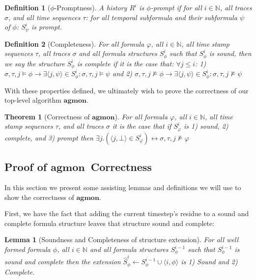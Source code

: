 \documentclass[10pt,a4paper]{article}
\newcommand{\rp}[2]{\ensuremath{\langle #1, #2 \rangle}}
\newcommand{\agmon}{\ensuremath{\mathbf{agmon}}}
\newtheorem{thm}{Theorem}
\newtheorem{tdef}{Definition}
\newtheorem{lemma}{Lemma}
\begin{document}
\begin{tdef}[$\phi$-Promptness]
A history $R^i$ is $\phi$-prompt if for all $i \in \mathbb{N}$, all traces $\sigma$, and all time sequences $\tau$: for all temporal subformula and their subformula $\psi$ of $\phi$: $S^i_{\psi}$ is prompt.
\end{tdef}

\begin{tdef}[Completeness] For all formula $\varphi$, all $i \in \mathbb{N}$, all time stamp sequences $\tau$, all traces $\sigma$ and all formula structures $S^i_{\phi}$ such that $S^i_{\phi}$ is sound, then we say the structure $S^i_{\phi}$ is complete if it is the case that: 
$\forall j \leq i$:
1) $\sigma, \tau, j \vDash \phi \rightarrow \exists\rp{j}{\psi} \in S^i_{\phi}: \sigma, \tau, j \vDash \psi$ 
and 
2) $\sigma, \tau, j \nvDash \phi \rightarrow \exists\rp{j}{\psi} \in S^i_{\phi}: \sigma, \tau, j \nvDash \psi$

\end{tdef}

With these properties defined, we ultimately wish to prove the correctness of our top-level algorithm \agmon.

\begin{thm}[Correctness of \agmon]
For all formula $\varphi$, all $i \in \mathbb{N}$, all time stamp sequences $\tau$, and all traces $\sigma$ it is the case that if $S^i_{\varphi}$ is 1) sound, 2) complete, and 3) prompt then $\exists j.(\rp{j}{\bot} \in S^i_{\varphi}) \leftrightarrow \sigma, \tau, j \nvDash \varphi$
\end{thm}

\subsection{Proof of \agmon\ Correctness}
In this section we present some assisting lemmas and definitions we will use to show the correctness of \agmon.


First, we have the fact that adding the current timestep's residue to a sound and complete formula structure leaves that structure sound and complete:

\begin{lemma}[Soundness and Completeness of structure extension]
For all well formed formula $\phi$, all $i \in \mathbb{N}$ and all formula structures $S^{i-1}_{\phi}$ such that $S^{i-1}_{\phi}$ is sound and complete then the extension $\hat{S}^{i}_{\phi} \leftarrow S^{i-1}_{\phi} \cup \rp{i}{\phi}$ is 1) Sound and 2) Complete.
\end{lemma}
\end{document}
